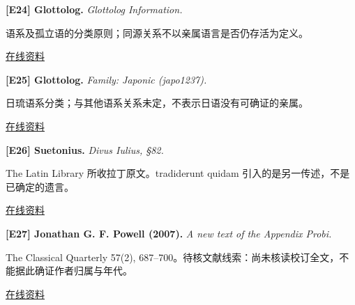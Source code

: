 \par\noindent\begin{minipage}{\linewidth}
\label{ref-24}\noindent\textbf{[E24] Glottolog.} \textit{Glottolog Information.}\par\nobreak
语系及孤立语的分类原则；同源关系不以亲属语言是否仍存活为定义。\par
{\small\href{https://glottolog.org/glottolog/glottologinformation}{在线资料}}\par
\par\end{minipage}\par

\par\noindent\begin{minipage}{\linewidth}
\label{ref-25}\noindent\textbf{[E25] Glottolog.} \textit{Family: Japonic (japo1237).}\par\nobreak
日琉语系分类；与其他语系关系未定，不表示日语没有可确证的亲属。\par
{\small\href{https://glottolog.org/resource/languoid/id/japo1237}{在线资料}}\par
\par\end{minipage}\par

\par\noindent\begin{minipage}{\linewidth}
\label{ref-26}\noindent\textbf{[E26] Suetonius.} \textit{Divus Iulius, §82.}\par\nobreak
The Latin Library 所收拉丁原文。tradiderunt quidam 引入的是另一传述，不是已确定的遗言。\par
{\small\href{https://www.thelatinlibrary.com/suetonius/suet.caesar.html}{在线资料}}\par
\par\end{minipage}\par

\par\noindent\begin{minipage}{\linewidth}
\label{ref-27}\noindent\textbf{[E27] Jonathan G. F. Powell (2007).} \textit{A new text of the Appendix Probi.}\par\nobreak
The Classical Quarterly 57(2), 687–700。待核文献线索：尚未核读校订全文，不能据此确证作者归属与年代。\par
{\small\href{https://doi.org/10.1017/S0009838807000638}{在线资料}}\par
\par\end{minipage}\par

